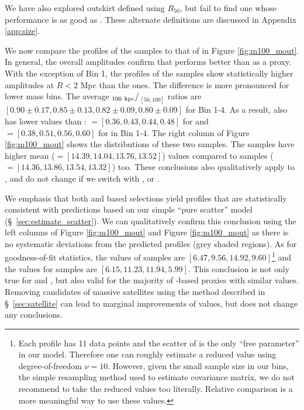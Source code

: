 \documentclass[fleqn,usenatbib,useAMS]{mnras}
\begin{document}
    We have also explored outskirt \mstar{} defined using $R_{50}$, but fail to find one whose
    performance is as good as . 
    These alternate definitions are discussed in Appendix \ref{app:size}. 
    
    We now compare the \dsigma{} profiles of the  \topn{} samples to that of
     in Figure \ref{fig:m100_mout}.
    In general, the overall amplitudes confirm that  performs better than 
    as a \mvir{} proxy.
    With the exception of Bin 1, the \dsigma{} profiles of the  samples show
    statistically higher amplitudes at $R < 2$ Mpc than the  ones.
    The difference is more pronounced for lower mass bins.  
    The average \dsigma{}$_{100\ \rm kpc}/$\dsigma{}$_{[50,100]}$ ratios are
    $[0.90\pm0.17, 0.85\pm0.13, 0.82\pm0.09, 0.80\pm0.09]$ for Bin 1-4.
    As a result,  also has lower \sigmvir{} values than : 
    \sigmvir{}$=[0.36, 0.43, 0.44, 0.48]$ for  and 
    \sigmvir{}$=[0.38, 0.51, 0.56, 0.60]$ for  in Bin 1-4.
    The right column of Figure \ref{fig:m100_mout} shows the \mvir{} distributions of these two
    samples.
    The  samples have higher mean \mvir{} (\logmvir{}$=[14.39, 14.04, 13.76, 13.52]$)
    values compared to  samples (\logmvir{}$=[14.36, 13.86, 13.54, 13.32]$) too.
    These conclusions also qualitatively apply to , and do not change if we switch
     with , or \mmax{}.

    We emphasis that both  and  based selections yield \dsigma{} profiles
    that are statistically consistent with predictions based on our simple ``pure scatter'' model
    (\S\ \ref{sec:estimate_scatter}). 
    We can qualitatively confirm this conclusion using the left columns of Figure
    \ref{fig:m100_mout} and Figure \ref{fig:m100_mout} as there is no systematic deviations from the
    predicted \dsigma{} profiles (grey shaded regions).
    As for goodness-of-fit statistics, the \chisq{} values of  samples are $[6.47, 9.56,
    14.92, 9.60]$\footnote{Each \dsigma{} profile has 11 data points and the scatter of \logmvir{}
    is the only ``free parameter'' in our model. 
    Therefore one can roughly estimate a reduced \chisq{} value using degree-of-freedom $\nu=10$.
    However, given the small sample size in our \topn{} bins, the simple resampling method used to
    estimate covariance matrix, we do not recommend to take the reduced \chisq{} values too
    literally. 
    Relative comparison is a more meaningful way to use these \chisq{} values.} and the values for
     samples are $[6.15, 11.23, 11.94, 5.99]$.
    This conclusion is not only true for  and , but also valid for the
    majority of \mstar{}-based \mvir{} proxies with similar \sigmvir{} values. 
    Removing candidates of massive satellites using the method described in \S\ \ref{sec:satellite}
    can lead to marginal improvements of \chisq{} values, but does not change any conclusions.
\end{document}
